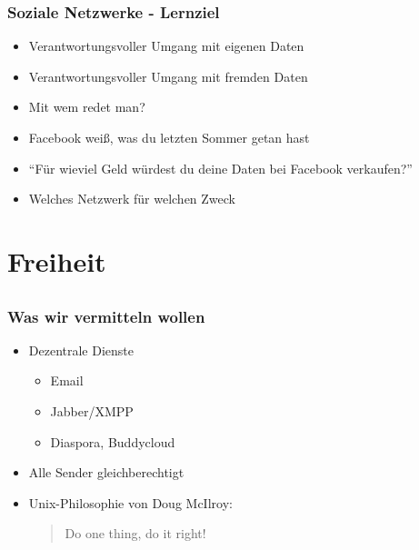 \documentclass[14pt,handout]{beamer}
\begin{document}
\begin{frame}
    \frametitle{Soziale Netzwerke - Lernziel}
    \begin{itemize}
        \item<2-> Verantwortungsvoller Umgang mit eigenen Daten
        \item<3-> Verantwortungsvoller Umgang mit fremden Daten
        \item<4-> Mit wem redet man?
        \item<5-> Facebook weiß, was du letzten Sommer getan hast
        \item<6-> "`Für wieviel Geld würdest du deine Daten bei Facebook verkaufen?"'
        \item<7-> Welches Netzwerk für welchen Zweck
    \end{itemize}
\end{frame}

\section{Freiheit}
\subsection{}

\begin{frame}
    \frametitle{Was wir vermitteln wollen}
    \begin{itemize}
        \item<2-> Dezentrale Dienste
            \begin{itemize}
                \item<3-> Email
                \item<4-> Jabber/XMPP
                \item<5-> Diaspora, Buddycloud
            \end{itemize}
        \item<6-> Alle Sender gleichberechtigt
        \item<7-> Unix-Philosophie von Doug McIlroy:
            \begin{quote}Do one thing, do it right!
            \end{quote}
    \end{itemize}
\end{frame}
\end{document}
